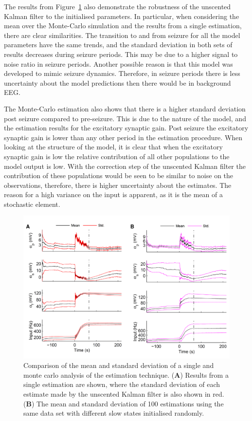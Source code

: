 The results from Figure~\ref{fig: MonteResults} also demonstrate the robustness of the unscented Kalman filter to the initialised parameters. In particular, when considering the mean over the Monte-Carlo simulation and the results from a single estimation, there are clear similarities. The transition to and from seizure for all the model parameters have the same trends, and the standard deviation in both sets of results decreases during seizure periods. This may be due to a higher signal to noise ratio in seizure periods. Another possible reason is that this model was developed to mimic seizure dynamics. Therefore, in seizure periods there is less uncertainty about the model predictions then there would be in background EEG.

The Monte-Carlo estimation also shows that there is a higher standard deviation post seizure compared to pre-seizure. This is due to the nature of the model, and the estimation results for the excitatory synaptic gain. Post seizure the excitatory synaptic gain is lower than any other period in the estimation procedure. When looking at the structure of the model, it is clear that when the excitatory synaptic gain is low the relative contribution of all other populations to the model output is low. With the correction step of the unscented Kalman filter the contribution of these populations would be seen to be similar to noise on the observations, therefore, there is higher uncertainty about the estimates. The reason for a high variance on the input is apparent, as it is the mean of a stochastic element. 

\begin{figure}[ht]
	\centering
		\includegraphics{fig/MonteResults.pdf}
	\caption{Comparison of the mean and standard deviation of a single and monte carlo analysis of the estimation technique. (\textbf{A}) Results from a single estimation are shown, where the standard deviation of each estimate made by the unscented Kalman filter is also shown in red. (\textbf{B}) The mean and standard deviation of 100 estimations using the same data set with different slow states initialised randomly.}
	\label{fig: MonteResults}
\end{figure}
 
